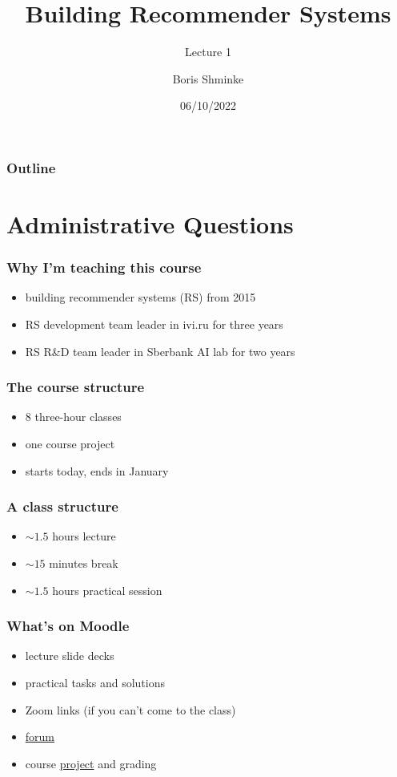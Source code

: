 \documentclass[t]{beamer}
\title{Building Recommender Systems}
\subtitle{Lecture 1}
\author{Boris Shminke}
\institute{Université Côte d'Azur, CNRS, LJAD, France}
\date{06/10/2022}
\begin{document}
\begin{frame}
  \titlepage  
\end{frame}  
\begin{frame}
  \frametitle{Outline}
  \tableofcontents
\end{frame}
\section{Administrative Questions}
\begin{frame}
  \frametitle{Why I'm teaching this course}
  \begin{itemize}
  \item building recommender systems (RS) from 2015
  \item RS development team leader in ivi.ru for three years
  \item RS R\&D team leader in Sberbank AI lab for two years
  \end{itemize}
\end{frame}
\begin{frame}
  \frametitle{The course structure}
  \begin{itemize}
  \item 8 three-hour classes
  \item one course project
  \item starts today, ends in January
  \end{itemize}
\end{frame}
\begin{frame}
  \frametitle{A class structure}
  \begin{itemize}
  \item $\sim1.5$ hours lecture
  \item $\sim15$ minutes break
  \item $\sim1.5$ hours practical session
  \end{itemize}
\end{frame}
\begin{frame}
  \frametitle{What's on Moodle}
  \begin{itemize}
  \item lecture slide decks
  \item practical tasks and solutions
  \item Zoom links (if you can't come to the class)
  \item \href{https://lms.univ-cotedazur.fr/2022/mod/forum/view.php?id=220784}{forum}
  \item course \href{https://lms.univ-cotedazur.fr/2022/mod/assign/view.php?id=234467}{project} and grading
  \end{itemize}
\end{frame}
\end{document}
